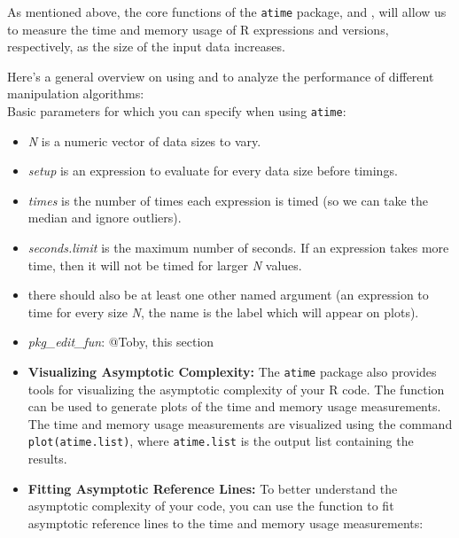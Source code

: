 \noindent As mentioned above, the core functions of the \texttt{atime} package,  and , will allow us to measure the time and memory usage of R expressions and versions, respectively, as the size of the input data increases.

\noindent Here's a general overview on using  and  to analyze the performance of different manipulation algorithms:\\

\noindent Basic parameters for which you can specify when using \texttt{atime}:

\begin{itemize}

  \item \textit{N} is a numeric vector of data sizes to vary.
  \item \textit{setup} is an expression to evaluate for every data size before timings.
  \item \textit{times} is the number of times each expression is timed (so we can take the median and ignore outliers).
  \item \textit{seconds.limit} is the maximum number of seconds. If an expression takes more time, then it will not be timed for larger \textit{N} values.
  \item there should also be at least one other named argument (an expression to time for every size \textit{N}, the name is the label which will appear on plots).
  \item \textit{pkg\_edit\_fun}: @Toby, this section

\end{itemize}

\begin{itemize}

    \item \textbf{Visualizing Asymptotic Complexity:} The \texttt{atime} package also provides tools for visualizing the asymptotic complexity of your R code. The  function can be used to generate plots of the time and memory usage measurements. The time and memory usage measurements are visualized using the command \texttt{plot(atime.list)}, where \texttt{atime.list} is the output list containing the results.

\vspace{0.1in}
\item \textbf{Fitting Asymptotic Reference Lines:} To better understand the asymptotic complexity of your code, you can use the  function to fit asymptotic reference lines to the time and memory usage measurements:

\end{itemize}

